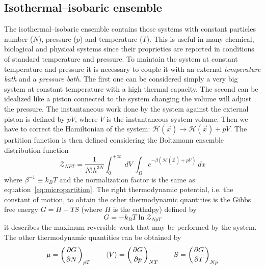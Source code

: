 \subsection{Isothermal--isobaric ensemble}
The isothermal--isobaric ensemble contains those systems with constant particles number ($N$), pressure ($p$) and temperature ($T$). This is useful in many chemical, biological and physical systems since their proprieties are reported in conditions of standard temperature and pressure. To maintain the system at constant temperature and pressure it is necessary to couple it with an external \textit{temperature bath} and a \textit{pressure bath}.
The first one can be considered simply a very big system at constant temperature with a high thermal capacity.
The second can be idealized like a piston connected to the system changing the volume will adjust the pressure.
The instantaneous work done by the system against the external piston is defined by $pV$, where $V$ is the instantaneous system volume. Then we have to correct the Hamiltonian of the system: $\mathcal{H}(\vec x) \rightarrow \mathcal{H}(\vec x) + pV$. The partition function is then defined considering the Boltzmann ensemble distribution function
\begin{equation}
	\mathcal{Z}_{NPT} = \frac{1}{N!h^{3N}}\int_0^{+\infty}\ dV \ \int_\Omega e^{-\beta(\mathcal{H}(\vec x) + pV)}\ dx
	\label{eq:nptPartition}
\end{equation}
where $\beta^{-1} \equiv k_B T$ and the normalization factor is the same as equation~\eqref{eq:micropartition}. The right thermodynamic potential, i.e. the constant of motion, to obtain the other thermodynamic quantities is the Gibbs free energy $G = H - TS$ (where $H$ is the enthalpy) defined by
\begin{equation*}
	G = -k_B T\ln \mathcal{Z}_{NpT}
\end{equation*}
it describes the maximum reversible work that may be performed by the system. The other thermodynamic quantities can be obtained by
\begin{equation*}
	\mu = \left ( \frac{\partial G}{\partial N}\right )_{pT} \qquad \left \langle V \right \rangle = \left ( \frac{\partial G}{\partial p}\right )_{NT} \qquad S = \left ( \frac{\partial G}{\partial T}\right )_{Np}
\end{equation*}

